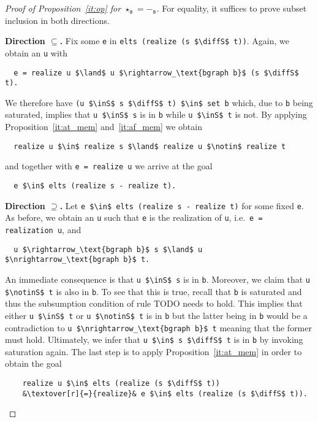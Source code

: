 \documentclass[sigplan,10pt,anonymous,review]{acmart}
\newcommand{\textover}[3][l]{%
 \makebox[\widthof{#3}][#1]{#2}%
}
\newcommand{\diffS}{-_\text{s}}
\newcommand{\inS}{\in_\text{s}}
\newcommand{\notinS}{\notin_\text{s}}
\begin{document}
\begin{proof}[Proof of Proposition~\ref{it:op} for $\star_\texttt{s} = -_\texttt{s}$]
  For equality, it suffices to prove subset inclusion in both directions.

  \textbf{Direction $\subseteq$. } Fix some \lstinline!e! in \lstinline!elts (realize (s $\diffS$ t))!.
  Again, we obtain an \lstinline!u! with 
\begin{lstlisting}
  e = realize u $\land$ u $\rightarrow_\text{bgraph b}$ (s $\diffS$ t).
\end{lstlisting}
  We therefore have \lstinline!(u $\inS$ s $\diffS$ t) $\in$ set b! which, due to \lstinline!b! being saturated, implies that \lstinline!u $\inS$ s! is in \lstinline!b! while \lstinline!u $\inS$ t! is not.
  By applying Proposition~\ref{it:at_mem} and~\ref{it:af_mem} we obtain
\begin{lstlisting}
  realize u $\in$ realize s $\land$ realize u $\notin$ realize t
\end{lstlisting}
  and together with \lstinline!e = realize u! we arrive at the goal 
\begin{lstlisting}
  e $\in$ elts (realize s - realize t).
\end{lstlisting}

\textbf{Direction $\supseteq$. } Let \lstinline[columns=fullflexible]!e $\in$ elts (realize s - realize t)! for some fixed \lstinline!e!.
  As before, we obtain an \lstinline!u! such that \lstinline!e! is the realization of \lstinline!u!, i.e.\ \lstinline!e = realization u!, and
\begin{lstlisting}
  u $\rightarrow_\text{bgraph b}$ s $\land$ u $\nrightarrow_\text{bgraph b}$ t.
\end{lstlisting}
  An immediate consequence is that \lstinline!u $\inS$ s! is in \lstinline!b!.
  Moreover, we claim that \lstinline!u $\notinS$ t! is also in \lstinline!b!.
  To see that this is true, recall that \lstinline!b! is saturated and thus the subsumption condition of rule TODO needs to hold.
  This implies that either \lstinline!u $\inS$ t! or \lstinline!u $\notinS$ t! is in \lstinline!b! but the latter being in \lstinline!b! would be a contradiction to \lstinline!u $\nrightarrow_\text{bgraph b}$ t! meaning that the former must hold.
  Ultimately, we infer that \lstinline!u $\in$ s $\diffS$ t! is in \lstinline!b! by invoking saturation again.
  The last step is to apply Proposition~\ref{it:at_mem} in order to obtain the goal
  \begin{lstlisting}
    realize u $\in$ elts (realize (s $\diffS$ t))
    &\textover[r]{=}{realize}& e $\in$ elts (realize (s $\diffS$ t)).
  \end{lstlisting}
\end{proof}
\end{document}

